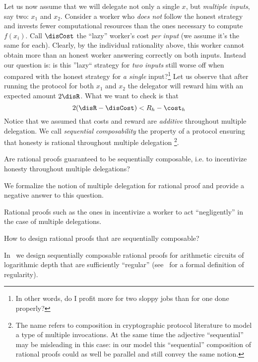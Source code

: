 {Let us now assume that we will delegate not only a single $x$, but \textit{multiple inputs}, say two: $x_1$ and $x_2$. Consider a worker who \textit{does not} follow the honest strategy and invests fewer computational resources than the ones necessary to compute $f(x_i)$. Call $\disCost$ the ``lazy'' worker's cost \textit{per input} (we assume it's the same for each). Clearly, by the individual rationality above, this worker cannot obtain more than an honest worker answering correctly on both inputs. Instead our question is: is this ''lazy`` strategy for \textit{two inputs} still worse off when compared with the honest strategy for \textit{a single} input?\footnote{In other words, do I profit more for two sloppy jobs than for one done properly?}
Let us observe that after running the protocol for both $x_1$ and $x_2$ the delegator will reward him with an expected amount $2\disR$. What we want to check is that
\[
	2(\disR - \disCost) <  R_h - \cost_h
\]
Notice that we assumed that costs and reward are \textit{additive} throughout multiple delegation. We call \textit{sequential composability} the property of a protocol ensuring that honesty is rational throughout multiple delegation \footnote{The name refers to composition in cryptographic protocol literature to model a type of multiple invocations. At the same time the adjective ``sequential'' may be misleading in this case: in our model this ``sequential'' composition of rational proofs could as well be parallel and still convey the same notion.}.

\begin{question}\label{q:seq-comp}
	Are rational proofs guaranteed to be sequentially composable, i.e. to incentivize honesty throughout multiple delegations?
\end{question}

We formalize the notion of multiple delegation for rational proof and provide a negative answer to this question.

\begin{result}[~\cite{cg15}]
	Rational proofs such as the ones in \cite{am1} incentivize a worker
	to act ``negligently'' in the case of multiple delegations.
\end{result}

\begin{question}
	How to design rational proofs that are sequentially composable?
\end{question}

In~\cite{cg15} we design sequentially composable rational proofs for arithmetic circuits of logarithmic depth that are sufficiently ``regular'' (see~\cite{cg15} for a formal definition of regularity).

}

